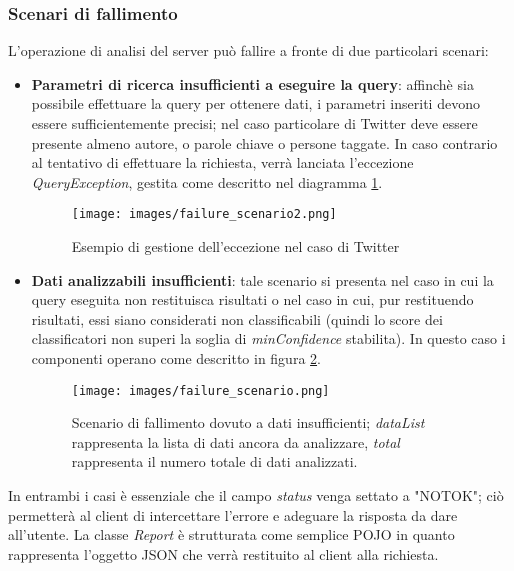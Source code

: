 \subsubsection{Scenari di fallimento}
L'operazione di analisi del server può fallire a fronte di due particolari scenari:
\begin{itemize}
    \item \textbf{Parametri di ricerca insufficienti a eseguire la query}: affinchè sia possibile effettuare la query per ottenere dati, i parametri inseriti devono essere sufficientemente precisi; nel caso particolare di Twitter deve essere presente almeno autore, o parole chiave o persone taggate. In caso contrario al tentativo di effettuare la richiesta, verrà lanciata l'eccezione \textit{QueryException}, gestita come descritto nel diagramma \ref{fig:fail_scenario2}.
    \begin{figure}[h]
        \centering
        \texttt{[image: images/failure\_scenario2.png]}
        \caption{Esempio di gestione dell'eccezione nel caso di Twitter}
        \label{fig:fail_scenario2}
    \end{figure}
    \item \textbf{Dati analizzabili insufficienti}: tale scenario si presenta nel caso in cui la query eseguita non restituisca risultati o nel caso in cui, pur restituendo risultati, essi siano considerati non classificabili (quindi lo score dei classificatori non superi la soglia di \textit{minConfidence} stabilita). In questo caso i componenti operano come descritto in figura  \ref{fig:fail_scenario}. 
    \begin{figure}[h!]
        \centering
        \texttt{[image: images/failure\_scenario.png]}
        \caption{Scenario di fallimento dovuto a dati insufficienti; \textit{dataList} rappresenta la lista di dati ancora da analizzare, \textit{total} rappresenta il numero totale di dati analizzati.}
        \label{fig:fail_scenario}
    \end{figure}
\end{itemize}
In entrambi i casi è essenziale che il campo \textit{status} venga settato a "NOTOK"; ciò permetterà al client di intercettare l'errore e adeguare la risposta da dare all'utente. La classe \textit{Report} è strutturata come semplice POJO in quanto rappresenta l'oggetto JSON che verrà restituito al client alla richiesta. 
